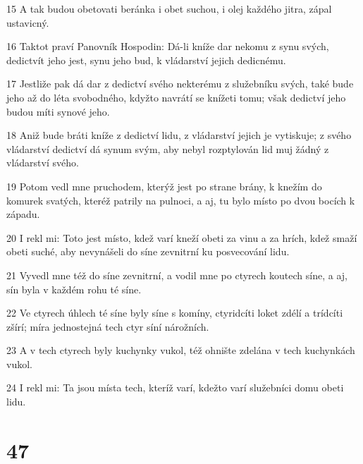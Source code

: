 \par 15 A tak budou obetovati beránka i obet suchou, i olej každého jitra, zápal ustavicný.
\par 16 Taktot praví Panovník Hospodin: Dá-li kníže dar nekomu z synu svých, dedictvít jeho jest, synu jeho bud, k vládarství jejich dedicnému.
\par 17 Jestliže pak dá dar z dedictví svého nekterému z služebníku svých, také bude jeho až do léta svobodného, kdyžto navrátí se knížeti tomu; však dedictví jeho budou míti synové jeho.
\par 18 Aniž bude bráti kníže z dedictví lidu, z vládarství jejich je vytiskuje; z svého vládarství dedictví dá synum svým, aby nebyl rozptylován lid muj žádný z vládarství svého.
\par 19 Potom vedl mne pruchodem, kterýž jest po strane brány, k knežím do komurek svatých, kteréž patrily na pulnoci, a aj, tu bylo místo po dvou bocích k západu.
\par 20 I rekl mi: Toto jest místo, kdež varí kneží obeti za vinu a za hrích, kdež smaží obeti suché, aby nevynášeli do síne zevnitrní ku posvecování lidu.
\par 21 Vyvedl mne též do síne zevnitrní, a vodil mne po ctyrech koutech síne, a aj, sín byla v každém rohu té síne.
\par 22 Ve ctyrech úhlech té síne byly síne s komíny, ctyridcíti loket zdélí a trídcíti zšírí; míra jednostejná tech ctyr síní nárožních.
\par 23 A v tech ctyrech byly kuchynky vukol, též ohnište zdelána v tech kuchynkách vukol.
\par 24 I rekl mi: Ta jsou místa tech, kteríž varí, kdežto varí služebníci domu obeti lidu.

\chapter{47}

